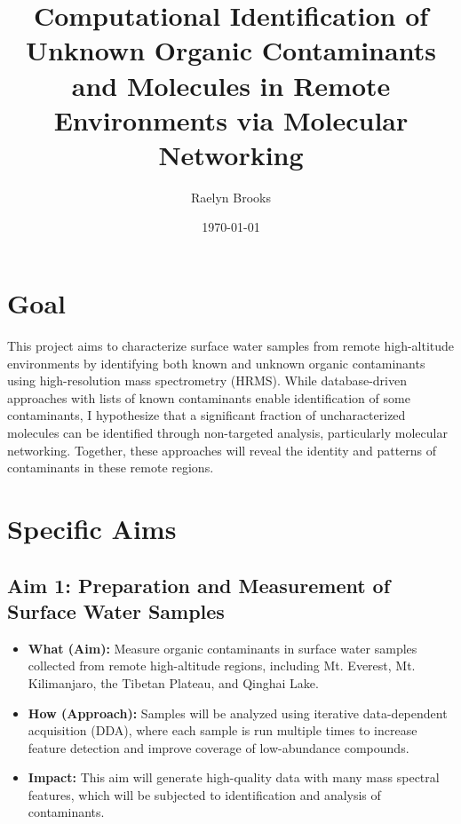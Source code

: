 \documentclass[11pt]{article}
\title{\textbf{Computational Identification of Unknown Organic Contaminants and Molecules in Remote Environments via Molecular Networking}}
\author{Raelyn Brooks}
\date{\today}
\begin{document}
\maketitle

\nocite{*}

\begin{doublespace}

\section{Goal}
    This project aims to characterize surface water samples from remote high-altitude environments by identifying both known and unknown organic contaminants using high-resolution mass spectrometry (HRMS).
    While database-driven approaches with lists of known contaminants enable identification of some contaminants, I hypothesize that a significant fraction of uncharacterized molecules can be identified through non-targeted analysis, particularly molecular networking.
    Together, these approaches will reveal the identity and patterns of contaminants in these remote regions.

\section{Specific Aims}
    \subsection{Aim 1: Preparation and Measurement of Surface Water Samples}
        \begin{itemize}
            \item {\textbf{What (Aim):}} Measure organic contaminants in surface water samples collected from remote high-altitude regions, including Mt. Everest, Mt. Kilimanjaro, the Tibetan Plateau, and Qinghai Lake.
            \item {\textbf{How (Approach):}} Samples will be analyzed using iterative data-dependent acquisition (DDA), where each sample is run multiple times to increase feature detection and improve coverage of low-abundance compounds.
            \item {\textbf{Impact:}} This aim will generate high-quality data with many mass spectral features, which will be subjected to identification and analysis of contaminants.
        \end{itemize}


\end{doublespace}
\end{document}
